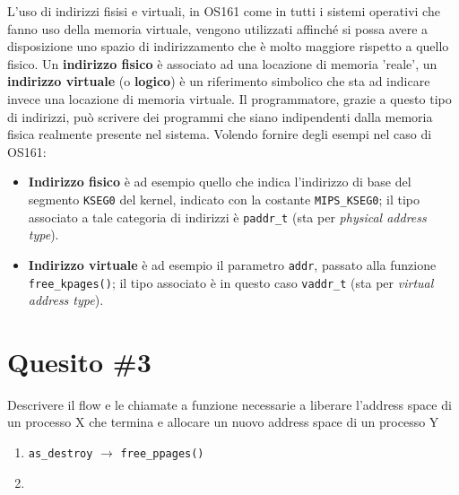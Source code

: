 \documentclass[12pt]{article}
\begin{document}
\noindent
L'uso di indirizzi fisisi e virtuali, in OS161 come in tutti i sistemi operativi che fanno uso della memoria virtuale, vengono utilizzati affinch\'e si possa avere a disposizione uno spazio di indirizzamento che \`e molto maggiore rispetto a quello fisico. Un \textbf{indirizzo fisico} \`e associato ad una locazione di memoria 'reale', un \textbf{indirizzo virtuale} (o \textbf{logico}) \`e un riferimento simbolico che sta ad indicare invece una locazione di memoria virtuale. Il programmatore, grazie a questo tipo di indirizzi, pu\`o scrivere dei programmi che siano indipendenti dalla memoria fisica realmente presente nel sistema.
Volendo fornire degli esempi nel caso di OS161:
\begin{itemize}
    \itemsep0em
    \item \textbf{Indirizzo fisico} \`e ad esempio quello che indica l'indirizzo di base del segmento \texttt{KSEG0} del kernel, indicato con la costante \texttt{MIPS\_KSEG0}; il tipo associato a tale categoria di indirizzi \`e \texttt{paddr\_t} (sta per \textit{physical address type}). 
    \item \textbf{Indirizzo virtuale} \`e ad esempio il parametro \texttt{addr}, passato alla funzione \texttt{free\_kpages()}; il tipo associato \`e in questo caso \texttt{vaddr\_t} (sta per \textit{virtual address type}).  
\end{itemize}

\section*{Quesito \#3}
{\color{blue}
    Descrivere il flow e le chiamate a funzione necessarie a liberare l'address space di un processo X che termina e allocare un nuovo address space di un processo Y
}

\begin{enumerate}
    \item \texttt{as\_destroy} $\to$ \texttt{free\_ppages()}
    \item 
\end{enumerate}


    
    
\end{document}
